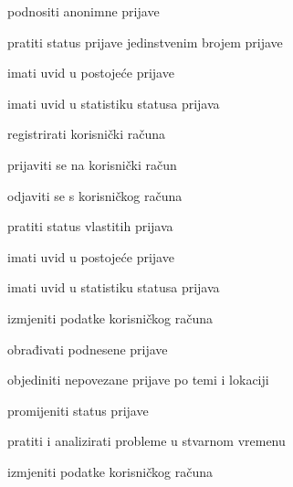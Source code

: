 \begin{packed_enum}
	\item  {}

	\begin{packed_enum}

		\item podnositi anonimne prijave
		\item pratiti status prijave jedinstvenim brojem prijave
		\item imati uvid u postojeće prijave
		\item imati uvid u statistiku statusa prijava
		\item registrirati korisnički računa


	\end{packed_enum}

	\item  {}

	\begin{packed_enum}

		\item prijaviti se na korisnički račun
		\item odjaviti se s korisničkog računa
		\item pratiti status vlastitih prijava
		\item imati uvid u postojeće prijave
		\item imati uvid u statistiku statusa prijava
		\item izmjeniti podatke korisničkog računa

	\end{packed_enum}

	\item {}

	\begin{packed_enum}

		\item obrađivati podnesene prijave
		\item objediniti nepovezane prijave po temi i lokaciji
		\item promijeniti status prijave
		\item pratiti i analizirati probleme u stvarnom vremenu
		\item izmjeniti podatke korisničkog računa

	\end{packed_enum}

	\item {}


\end{packed_enum}
